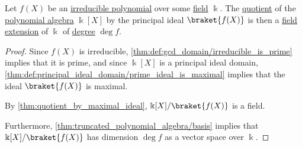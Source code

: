 \begin{lemma}\label{thm:quotient_by_irreducible_polynomial}
  Let \( f(X) \) be an \hyperref[def:domain_divisibility/irreducible]{irreducible polynomial} over some \hyperref[def:field]{field} \( \Bbbk \). The \hyperref[def:algebra_over_ring/quotient]{quotient} of the \hyperref[def:polynomial_algebra]{polynomial algebra} \( \Bbbk[X] \) by the principal ideal \( \braket{ f(X) } \) is then a \hyperref[def:field/subobject]{field extension} of \( \Bbbk \) of \hyperref[def:field_extension_degree]{degree} \( \deg f \).
\end{lemma}
\begin{proof}
  Since \( f(X) \) is irreducible, \cref{thm:def:gcd_domain/irreducible_is_prime} implies that it is prime, and since \( \Bbbk[X] \) is a principal ideal domain, \cref{thm:def:principal_ideal_domain/prime_ideal_is_maximal} implies that the ideal \( \braket{ f(X) } \) is maximal.

  By \cref{thm:quotient_by_maximal_ideal}, \( \Bbbk[X] / \braket{ f(X) } \) is a field.

  Furthermore, \cref{thm:truncated_polynomial_algebra/basis} implies that \( \Bbbk[X] / \braket{ f(X) } \) has dimension \( \deg f \) as a vector space over \( \Bbbk \).
\end{proof}

